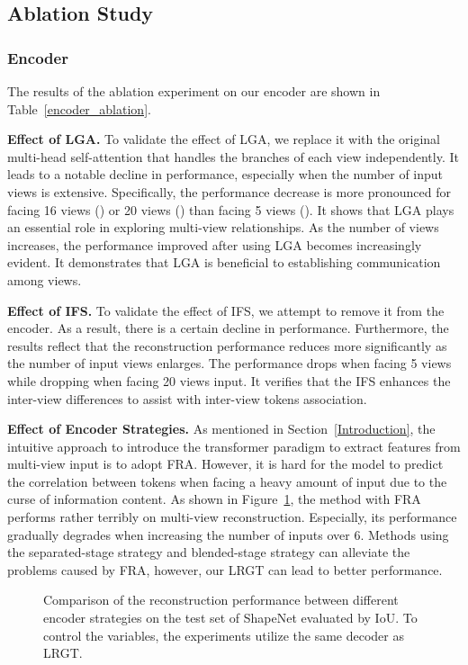 \documentclass[10pt,twocolumn,letterpaper]{article}
\begin{document}
\subsection{Ablation Study}
\label{experiments::ablation}
\subsubsection{Encoder}
The results of the ablation experiment on our encoder are shown in Table~\ref{encoder_ablation}.

\textbf{Effect of LGA.} To validate the effect of LGA, we replace it with the original multi-head self-attention that handles the branches of each view independently. It leads to a notable decline in performance, especially when the number of input views is extensive. Specifically, the performance decrease is more pronounced for facing 16 views () or 20 views () than facing 5 views (). It shows that LGA plays an essential role in exploring multi-view relationships. As the number of views increases, the performance improved after using LGA becomes increasingly evident. It demonstrates that LGA is beneficial to establishing communication among views.

\textbf{Effect of IFS.} To validate the effect of IFS, we attempt to remove it from the encoder. As a result, there is a certain decline in performance. Furthermore, the results reflect that the reconstruction performance reduces more significantly as the number of input views enlarges. The performance drops  when facing 5 views while dropping  when facing 20 views input. It verifies that the IFS enhances the inter-view differences to assist with inter-view tokens association. 


\textbf{Effect of Encoder Strategies.} As mentioned in Section~\ref{Introduction}, the intuitive approach to introduce the transformer paradigm to extract features from multi-view input is to adopt FRA. However, it is hard for the model to predict the correlation between tokens when facing a heavy amount of input due to the curse of information content. As shown in Figure~\ref{strategy2}, the method with FRA performs rather terribly on multi-view reconstruction. Especially, its performance gradually degrades when increasing the number of inputs over 6. Methods using the separated-stage strategy and blended-stage strategy can alleviate the problems caused by FRA, however, our LRGT can lead to better performance.


\begin{figure}[t]
	\centering
	\caption{Comparison of the reconstruction performance between different encoder strategies on the test set of ShapeNet evaluated by IoU. To control the variables, the experiments utilize the same decoder as LRGT.}
	\label{strategy2}
\end{figure}
\end{document}
